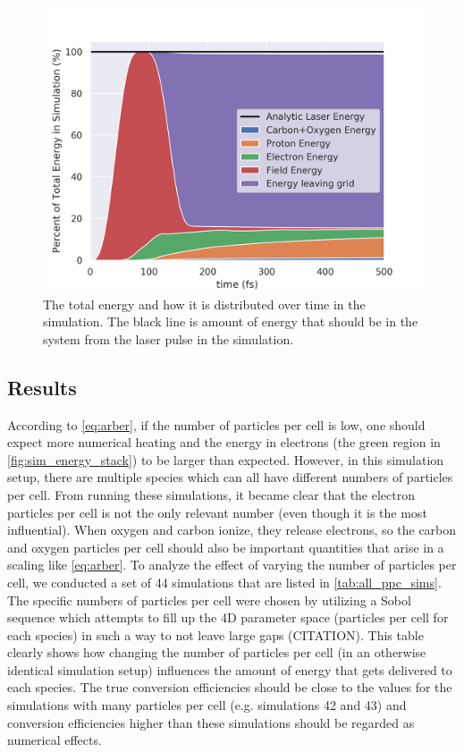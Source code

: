 \begin{figure}
	\includegraphics[width=0.9\linewidth]{planning/images/arber/Energy_Plot_2D.png}
	\caption{The total energy and how it is distributed over time in the simulation. The black line is amount of energy that should be in the system from the laser pulse in the simulation.} \label{fig:sim_energy_stack} 
\end{figure}

\subsection{Results}
According to \autoref{eq:arber}, if the number of particles per cell is low, one should expect more numerical heating and the energy in electrons (the green region in \autoref{fig:sim_energy_stack}) to be larger than expected. However, in this simulation setup, there are multiple species which can all have different numbers of particles per cell. From running these simulations, it became clear that the electron particles per cell is not the only relevant number (even though it is the most influential). When oxygen and carbon ionize, they release electrons, so the carbon and oxygen particles per cell should also be important quantities that arise in a scaling like \autoref{eq:arber}. To analyze the effect of varying the number of particles per cell, we conducted a set of 44 simulations that are listed in \autoref{tab:all_ppc_sims}. The specific numbers of particles per cell were chosen by utilizing a Sobol sequence which attempts to fill up the 4D parameter space (particles per cell for each species) in such a way to not leave large gaps (CITATION). This table clearly shows how changing the number of particles per cell (in an otherwise identical simulation setup) influences the amount of energy that gets delivered to each species. The true conversion efficiencies should be close to the values for the simulations with many particles per cell (e.g. simulations 42 and 43) and conversion efficiencies higher than these simulations should be regarded as numerical effects.

